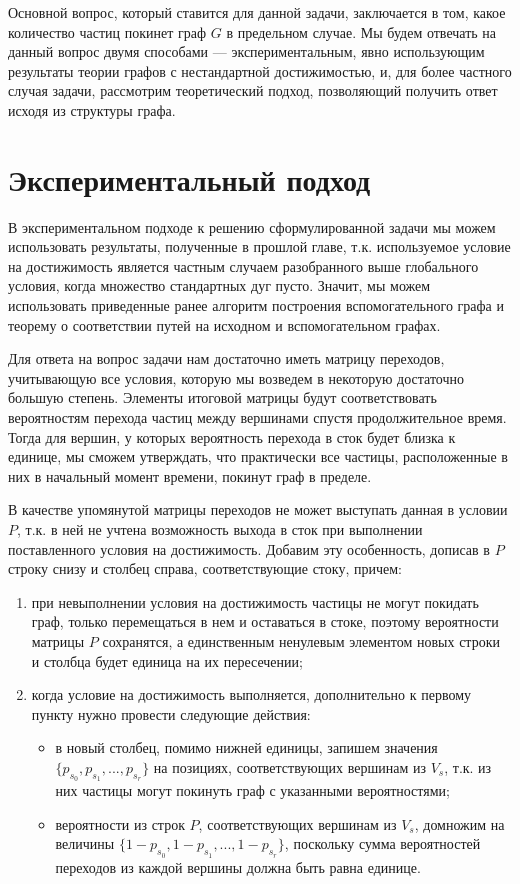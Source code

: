 	Основной вопрос, который ставится для данной задачи, заключается в том, какое количество частиц покинет граф $G$ в предельном случае. Мы будем отвечать на данный вопрос двумя способами --- экспериментальным, явно использующим результаты теории графов с нестандартной достижимостью, и, для более частного случая задачи, рассмотрим теоретический подход, позволяющий получить ответ исходя из структуры графа. 
	
	\section{Экспериментальный подход}
	
	В экспериментальном подходе к решению сформулированной задачи мы можем использовать результаты, полученные в прошлой главе, т.к. используемое условие на достижимость является частным случаем разобранного выше глобального условия, когда множество стандартных дуг пусто. Значит, мы можем использовать приведенные ранее алгоритм построения вспомогательного графа и теорему о соответствии путей на исходном и вспомогательном графах.  
	
	Для ответа на вопрос задачи нам достаточно иметь матрицу переходов, учитывающую все условия, которую мы возведем в некоторую достаточно большую степень. Элементы итоговой матрицы будут соответствовать вероятностям перехода частиц между вершинами спустя продолжительное время. Тогда для вершин, у которых вероятность перехода в сток будет близка к единице, мы сможем утверждать, что практически все частицы, расположенные в них в начальный момент времени, покинут граф в пределе. 
	
	В качестве упомянутой матрицы переходов не может выступать данная в условии $P$, т.к. в ней не учтена возможность выхода в сток при выполнении поставленного условия на достижимость. Добавим эту особенность, дописав в $P$ строку снизу и столбец справа, соответствующие стоку, причем:
	\begin{enumerate} 
		\item при невыполнении условия на достижимость частицы не могут покидать граф, только перемещаться в нем и оставаться в стоке, поэтому вероятности матрицы $P$ сохранятся, а единственным ненулевым элементом новых строки и столбца будет единица на их пересечении;
		\item когда условие на достижимость выполняется, дополнительно к первому пункту нужно провести следующие действия:
		\begin{itemize}
			\item в новый столбец, помимо нижней единицы, запишем значения $\{p_{s_0}, p_{s_1}, ... , p_{s_r}\}$ на позициях, соответствующих вершинам из $V_s$, т.к. из них частицы могут покинуть граф с указанными вероятностями;
			\item вероятности из строк $P$, соответствующих вершинам из $V_s$, домножим на величины $\{ 1 - p_{s_0}, 1 - p_{s_1}, ... , 1 - p_{s_r}\}$, поскольку сумма вероятностей переходов из каждой вершины должна быть равна единице.
		\end{itemize}	
	\end{enumerate}

